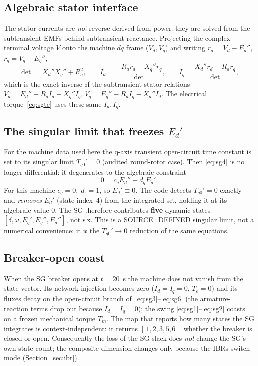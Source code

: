 \documentclass[12pt,a4paper]{article}
\theoremstyle{remark}
\begin{document}
\subsection{Algebraic stator interface}
The stator currents are \emph{not} reverse-derived from power; they are solved
from the subtransient EMFs behind subtransient reactance. Projecting the complex
terminal voltage $V$ onto the machine $dq$ frame ($V_d,V_q$) and writing
$r_d=V_d-E_d''$, $r_q=V_q-E_q''$,
\begin{equation}
  \det=X_d''X_q''+R_a^2,\qquad
  I_d=\frac{-R_a r_d - X_q'' r_q}{\det},\qquad
  I_q=\frac{X_d'' r_d - R_a r_q}{\det},
  \label{eq:stator}
\end{equation}
which is the exact inverse of the subtransient stator relations
$V_d=E_d''-R_a I_d+X_q'' I_q$, $V_q=E_q''-R_a I_q-X_d'' I_d$. The electrical
torque~\eqref{eq:sgte} uses these same $I_d,I_q$.

\subsection{The singular limit that freezes $E_d'$}\label{sec:frozen}
For the machine data used here the q-axis transient open-circuit time constant is
set to its singular limit $T_{q0}'=0$ (audited round-rotor case). Then
\eqref{eq:sg4} is no longer differential: it degenerates to the algebraic
constraint
\begin{equation}
  0 = c_q E_d'' - d_q E_d'.
\end{equation}
For this machine $c_q=0,\;d_q=1$, so $E_d'\equiv 0$. The code detects
$T_{q0}'=0$ exactly and \emph{removes} $E_d'$ (state index~4) from the integrated
set, holding it at its algebraic value $0$. The SG therefore contributes
\textbf{five} dynamic states $[\delta,\omega,E_q',E_q'',E_d'']$, not six. This is
a \textsf{SOURCE\_DEFINED} singular limit, not a numerical convenience: it is the
$T_{q0}'\to0$ reduction of the same equations.

\subsection{Breaker-open coast}
When the SG breaker opens at $t=20$~s the machine does not vanish from the state
vector. Its network injection becomes zero ($I_d=I_q=0$, $T_e=0$) and its fluxes
decay on the open-circuit branch of~\eqref{eq:sg3}--\eqref{eq:sg6} (the
armature-reaction terms drop out because $I_d=I_q=0$); the swing
\eqref{eq:sg1}--\eqref{eq:sg2} coasts on a frozen mechanical torque $T_m$. The
map that reports how many states the SG integrates is context-independent: it
returns $[\,1,2,3,5,6\,]$ whether the breaker is closed or open. Consequently the
loss of the SG slack does \emph{not} change the SG's own state count; the
composite dimension changes only because the IBRs switch mode
(Section~\ref{sec:ibr}).
\end{document}
